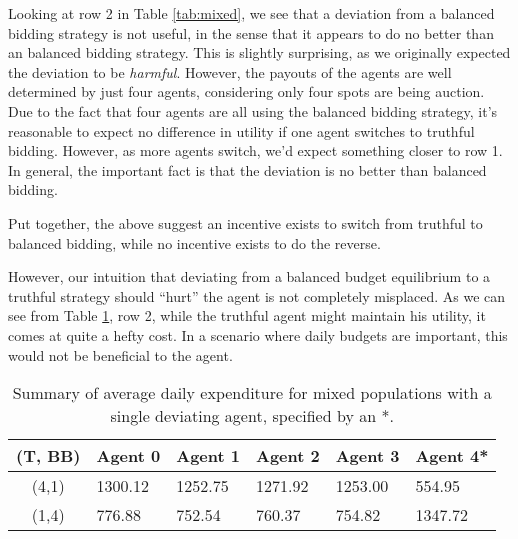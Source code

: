 \documentclass[11pt]{article}
\begin{document}
\begin{enumerate}
\begin{enumerate}
  Looking at row 2 in Table \ref{tab:mixed}, we see that a deviation from a balanced bidding strategy is not useful, in the sense that it appears to do no better than an balanced bidding strategy. This is slightly surprising, as we originally expected the deviation to be {\it harmful}. However, the payouts of the agents are well determined by just four agents, considering only four spots are being auction. Due to the fact that four agents are all using the balanced bidding strategy, it's reasonable to expect no difference in utility if one agent switches to truthful bidding. However, as more agents switch, we'd expect something closer to row 1. In general, the important fact is that the deviation is no better than balanced bidding. 

  Put together, the above suggest an incentive exists to switch from truthful to balanced bidding, while no incentive exists to do the reverse. 

  However, our intuition that deviating from a balanced budget equilibrium to a truthful strategy should ``hurt'' the agent is not completely misplaced. As we can see from Table \ref{tab:mixed_spend}, row 2, while the truthful agent might maintain his utility, it comes at quite a hefty cost. In a scenario where daily budgets are important, this would not be beneficial to the agent. 
  \begin{table}[h]
    \centering
    \begin{tabular}{clllll}
    \hline
    (T, BB) & Agent 0 & Agent 1 & Agent 2 & Agent 3 & Agent 4*         \\ \hline
    (4,1)   & 1300.12  & 1252.75  & 1271.92  & 1253.00 &  554.95          \\
    (1,4)   & 776.88 & 752.54 & 760.37 & 754.82 & 1347.72 \\ \hline
    \end{tabular}
    \caption{Summary of average daily expenditure for mixed populations with a single deviating agent, specified by an *.}
    \label{tab:mixed_spend}
  \end{table}
  \end{enumerate}
\end{enumerate}
\end{document}
